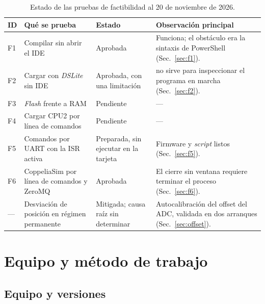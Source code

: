 \documentclass[12pt,letterpaper]{article}
\newcommand{\cod}[1]{\texttt{\detokenize{#1}}}
\begin{document}
\begin{table}[!htbp]
\centering
\caption{Estado de las pruebas de factibilidad al 20 de noviembre de 2026.}
\label{tab:estado}
\begin{tabularx}{\textwidth}{>{\raggedright\arraybackslash}p{0.9cm}>{\raggedright\arraybackslash}p{4.4cm}>{\raggedright\arraybackslash}p{2.6cm}Y}
\toprule
\textbf{ID} & \textbf{Qué se prueba} & \textbf{Estado} & \textbf{Observación principal} \\
\midrule
F1 & Compilar sin abrir el IDE & Aprobada & Funciona; el obstáculo era la sintaxis de PowerShell (Sec.~\ref{sec:f1}). \\
F2 & Cargar con \textit{DSLite} sin IDE & Aprobada, con una limitación & \cod{DSLite memory} no sirve para inspeccionar el programa en marcha (Sec.~\ref{sec:f2}). \\
F3 & \textit{Flash} frente a RAM & Pendiente & --- \\
F4 & Cargar CPU2 por línea de comandos & Pendiente & --- \\
F5 & Comandos por UART con la ISR activa & Preparada, sin ejecutar en la tarjeta & Firmware y \textit{script} listos (Sec.~\ref{sec:f5}). \\
F6 & CoppeliaSim por línea de comandos y ZeroMQ & Aprobada & El cierre sin ventana requiere terminar el proceso (Sec.~\ref{sec:f6}). \\
\midrule
--- & Desviación de posición en régimen permanente & Mitigada; causa raíz sin determinar & Autocalibración del offset del ADC, validada en dos arranques (Sec.~\ref{sec:offset}). \\
\bottomrule
\end{tabularx}
\end{table}

\section{Equipo y método de trabajo}
\label{sec:metodo}

\subsection{Equipo y versiones}
\end{document}
